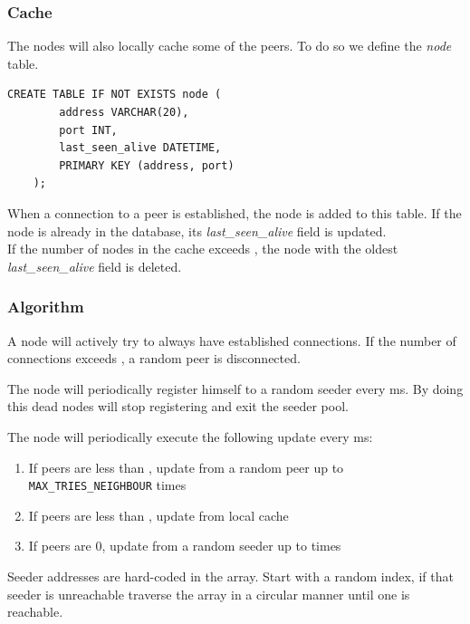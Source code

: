 \documentclass[../documentation.tex]{subfiles}
\begin{document}
\subsubsection{Cache}

The nodes will also locally cache some of the peers.
To do so we define the \textit{node} table.

\begin{lstlisting}[style=sql]
    CREATE TABLE IF NOT EXISTS node (
        address VARCHAR(20),
        port INT,
        last_seen_alive DATETIME,
        PRIMARY KEY (address, port)
    );
\end{lstlisting}

When a connection to a peer is established, the node is added to this table.
If the node is already in the database, its \textit{last\_seen\_alive} field is updated.
\\
If the number of nodes in the cache exceeds ,
the node with the oldest \textit{last\_seen\_alive} field is deleted.

\subsubsection{Algorithm}

A node will actively try to always have  established connections.
If the number of connections exceeds , a random peer is disconnected.

The node will periodically register himself to a random seeder every  ms.
By doing this dead nodes will stop registering and exit the seeder pool.

\pagebreak

The node will periodically execute the following update every  ms:

\begin{enumerate}
    \item If peers are less than , update from a random peer up to \texttt{MAX\_TRIES\_NEIGHBOUR} times
    \item If peers are less than , update from local cache
    \item If peers are \(0\), update from a random seeder up to  times
\end{enumerate}

Seeder addresses are hard-coded in the  array.
Start with a random index, if that seeder is unreachable traverse the array in a circular manner
until one is reachable.
\end{document}
